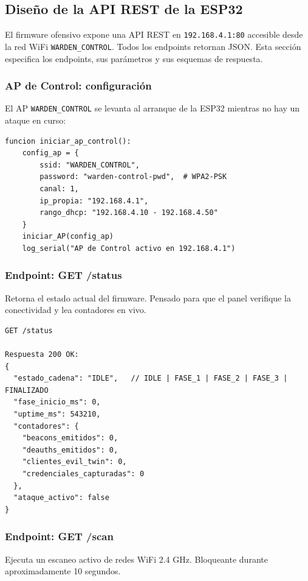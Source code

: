 \documentclass[11pt,a4paper]{article}
\begin{document}
\subsection{Diseño de la API REST de la ESP32}

El firmware ofensivo expone una API REST en \texttt{192.168.4.1:80}
accesible desde la red WiFi \texttt{WARDEN\_CONTROL}. Todos los endpoints
retornan JSON. Esta sección especifica los endpoints, sus parámetros y
sus esquemas de respuesta.

\subsubsection{AP de Control: configuración}

El AP \texttt{WARDEN\_CONTROL} se levanta al arranque de la ESP32
mientras no hay un ataque en curso:

\begin{lstlisting}
funcion iniciar_ap_control():
    config_ap = {
        ssid: "WARDEN_CONTROL",
        password: "warden-control-pwd",  # WPA2-PSK
        canal: 1,
        ip_propia: "192.168.4.1",
        rango_dhcp: "192.168.4.10 - 192.168.4.50"
    }
    iniciar_AP(config_ap)
    log_serial("AP de Control activo en 192.168.4.1")
\end{lstlisting}

\subsubsection{Endpoint: GET /status}

Retorna el estado actual del firmware. Pensado para que el panel
verifique la conectividad y lea contadores en vivo.

\begin{lstlisting}
GET /status

Respuesta 200 OK:
{
  "estado_cadena": "IDLE",   // IDLE | FASE_1 | FASE_2 | FASE_3 | FINALIZADO
  "fase_inicio_ms": 0,
  "uptime_ms": 543210,
  "contadores": {
    "beacons_emitidos": 0,
    "deauths_emitidos": 0,
    "clientes_evil_twin": 0,
    "credenciales_capturadas": 0
  },
  "ataque_activo": false
}
\end{lstlisting}

\subsubsection{Endpoint: GET /scan}

Ejecuta un escaneo activo de redes WiFi 2.4 GHz. Bloqueante durante
aproximadamente 10 segundos.
\end{document}
